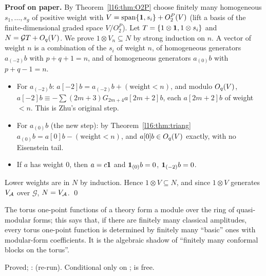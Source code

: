 \textbf{Proof on paper.} By Theorem~\ref{l16:thm:O2P} choose finitely many homogeneous $s_1,\dots,s_g$ of positive
weight with $V = \operatorname{span}\{\mathbf{1},s_i\} + O_2^P(V)$ (lift a basis of the finite-dimensional graded
space $V/O_2^P$). Let $T = \{1\otimes\mathbf{1},1\otimes s_i\}$ and $N = \mathcal G T + O_q(V)$. We prove
$1\otimes V_n\subseteq N$ by strong induction on $n$. A vector of weight $n$ is a combination of the $s_i$ of weight $n$,
of homogeneous generators $a_{(-2)}b$ with $p+q+1 = n$, and of homogeneous generators $a_{(0)}b$ with $p+q-1 = n$.
\begin{itemize}
\item For $a_{(-2)}b$: $a[-2]b = a_{(-2)}b + (\text{weight}<n)$, and modulo $O_q(V)$,
  $a[-2]b\equiv-\sum(2m+3)G_{2m+4}a[2m+2]b$, each $a[2m+2]b$ of weight $<n$. This is Zhu's original step.
\item For $a_{(0)}b$ (the new step): by Theorem~\ref{l16:thm:triang} $a_{(0)}b = a[0]b - (\text{weight}<n)$, and
  $a[0]b\in O_q(V)$ exactly, with no Eisenstein tail.
\item If $a$ has weight $0$, then $a = c\mathbf{1}$ and $\mathbf{1}_{(0)}b = 0$, $\mathbf{1}_{(-2)}b = 0$.
\end{itemize}
Lower weights are in $N$ by induction. Hence $1\otimes V\subseteq N$, and since $1\otimes V$ generates $V_{\mathcal A}$ over
$\mathcal G$, $N = V_{\mathcal A}$. \qed

\begin{physics}
The torus one-point functions of a theory form a module over the ring of quasi-modular forms; this says that, if
there are finitely many classical amplitudes, every torus one-point function is determined by finitely many
``basic'' ones with modular-form coefficients. It is the algebraic shadow of ``finitely many conformal blocks on the
torus''.
\end{physics}

\begin{status}
Proved; \allowbreak{}\allowbreak{}\allowbreak{}\allowbreak{}: \lean{[propext, Classical.}\allowbreak{}\allowbreak\lean{sound]}
(re-run). Conditional only on ;  is free.
\end{status}

